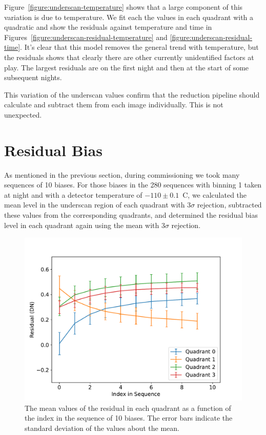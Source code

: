 \documentclass{article}
\begin{document}
Figure~\ref{figure:underscan-temperature} shows that a large component of this variation is due to temperature. We fit each the values in each quadrant with a quadratic and show the residuals against temperature and time in Figures~\ref{figure:underscan-residual-temperature} and \ref{figure:underscan-residual-time}. It's clear that this model removes the general trend with temperature, but the residuals shows that clearly there are other currently unidentified factors at play. The largest residuals are on the first night  and then at the start of some subsequent nights.

This variation of the underscan values confirm that the reduction pipeline should calculate and subtract them from each image individually. This is not unexpected.

\clearpage
\section{Residual Bias}

As mentioned in the previous section, during commissioning we took many sequences of 10 biases. For those biases in the 280 sequences with binning 1 taken at night and with a detector temperature of $-110\pm0.1$~C, we calculated the mean level in the underscan region of each quadrant with $3\sigma$ rejection, subtracted these values from the corresponding quadrants, and determined the residual bias level in each quadrant again using the mean with $3\sigma$ rejection.

\begin{figure}[pb]
\begin{center}
\includegraphics[width=0.7\columnwidth]{figures/bias-residual-sequence.pdf}
\medskip
\caption{The mean values of the residual in each quadrant as a function of the index in the sequence of 10 biases. The error bars indicate the standard deviation of the values about the mean.}
\label{figure:bias-residual-sequence}
\end{center}
\end{figure}
\end{document}
